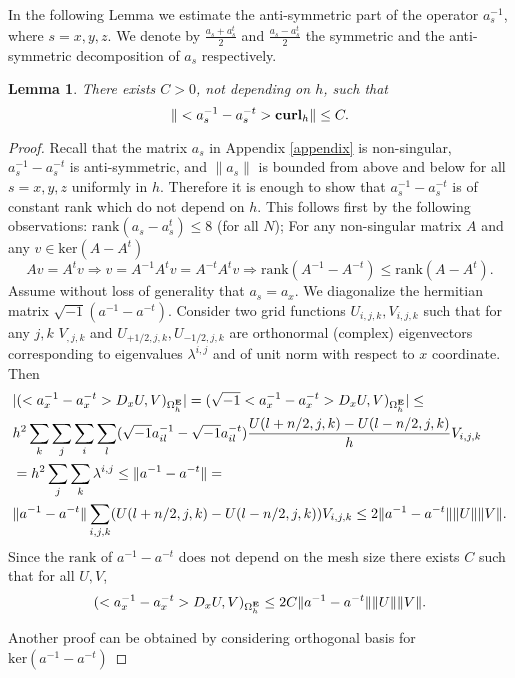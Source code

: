 \documentclass[12pt,reqno]{amsart}
\newcommand{\curl}{{\bf curl}}
\newcommand{\e}{{\bf E}}
\newtheorem{lem}[theorem]{Lemma}
\theoremstyle{definition}
\numberwithin{equation}{section}
\def\Gwh{\Omega_h}
\begin{document}
In the following Lemma we estimate the anti-symmetric part of the operator $a_s^{-1}$, where $s=x,y,z$.
    We denote by $\frac{a_s+a_s^t}{2}$ and $\frac{a_s-a_s^t}{2}$ the symmetric and the anti-symmetric decomposition of $a_s$ respectively.
\begin{lem}\label{lem:antiestimates}
	There exists $C>0$, not depending on $h$, such that $$\|<a_s^{-1}-a_s^{-t}>\curl_h\|\leq C.$$
\end{lem}
\begin{proof}
	Recall that the matrix  $a_s $ in Appendix \ref{appendix} is non-singular,  $a_s^{-1}-a_s^{-t}$ is anti-symmetric, and $\|a_s\|$  is bounded from above and below for all $s=x,y,z$ uniformly in $h$. Therefore it is enough to show that $a_s^{-1}-a_s^{-t}$ is of constant rank which do not depend on $h$. This follows  first by the following  observations: 
	$\mathrm{rank}(a_s-a_s^t)\leq 8$ (for all $N$); For any non-singular matrix $A$ and any $v\in \mathrm{ker}(A-A^t)$
	$$
	Av=A^tv \Rightarrow v=A^{-1}A^{t}v=A^{-t}A^{t}v\Rightarrow
	\mathrm{rank}(A^{-1}-A^{-t})\leq 	\mathrm{rank}(A-A^t).
	$$
	Assume without loss of generality that $a_s=a_x$. 
	We diagonalize the hermitian matrix $\sqrt{-1}(a^{-1}-a^{-t})$.
	Consider  two grid functions $U_{i,j,k}, V_{i,j,k}$
	such that for any $j,k$ $V_{,j,k}$ and $U_{+1/2,j,k},U_{-1/2,j,k}$ are orthonormal (complex) eigenvectors corresponding to  eigenvalues $\lambda^{i,j} $ and of unit norm with respect to $x$ coordinate. Then  
	\begin{align*}
		&| (<a_x^{-1}-a_x^{-t}>D_x U,V)_{\Gwh^\e}|= (\sqrt{-1}<a_x^{-1}-a_x^{-t}>D_x U,V)_{\Gwh^\e}|
\leq \\&
	h^2\sum_k\sum_j\sum_i \sum_{l} (\sqrt{-1}a_{il}^{-1}-\sqrt{-1}a_{il}^{-t})\frac{U(l+n/2,j,k)-U(l-n/2,j,k)}{h}V_{i,j,k}\\&
		=
	h^2\sum_j\sum_k\lambda^{i,j} \leq \|a^{-1}-a^{-t}\|=\\&
	\|a^{-1}-a^{-t}\|\sum_{i,j,k}(U(l+n/2,j,k)-U(l-n/2,j,k))V_{i,j,k}\leq 
		2\|a^{-1}-a^{-t}\|\|U\| \|V\|.
	 	\end{align*}
 Since the $\mathrm{rank}$ of $a^{-1}-a^{-t}$ does not depend on the mesh size there exists $C$ such that for all $U,V$, $$(<a_x^{-1}-a_x^{-t}>D_x U,V)_{\Gwh^\e}\leq2 C\|a^{-1}-a^{-t}\|\|U\|\|V\|.$$
 
 Another proof can be obtained by considering  orthogonal basis for $\mathrm{ker}(a^{-1}-a^{-t})$
\end{proof}
\end{document}

